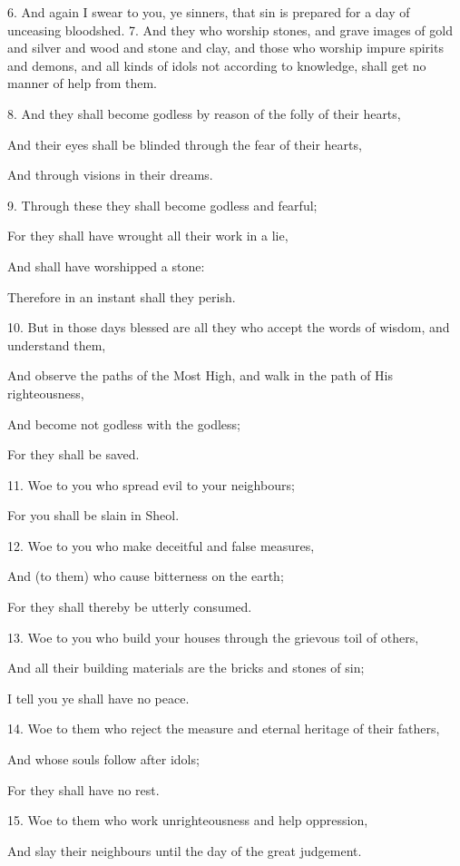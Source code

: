6. And again I swear to you, ye sinners, that sin is
prepared for a day of unceasing bloodshed. 7. And
they who worship stones, and grave images of gold
and silver and wood and stone and clay, and those
who worship impure spirits and demons, and all
kinds of idols not according to knowledge, shall get
no manner of help from them.

8. And they shall become godless by reason of the folly of their hearts,

And their eyes shall be blinded through the fear of their hearts,

And through visions in their dreams.

9. Through these they shall become godless and fearful;

For they shall have wrought all their work in a lie,

And shall have worshipped a stone:

Therefore in an instant shall they perish.

10. But in those days blessed are all they who accept the words of wisdom, and understand them,

And observe the paths of the Most High, and walk in the path of His righteousness,

And become not godless with the godless;

For they shall be saved.

11. Woe to you who spread evil to your neighbours;

For you shall be slain in Sheol.

12. Woe to you who make deceitful and false measures,

And (to them) who cause bitterness on the earth;

For they shall thereby be utterly consumed.

13. Woe to you who build your houses through the grievous toil of others,

And all their building materials are the bricks and stones of sin;

I tell you ye shall have no peace.

14. Woe to them who reject the measure and eternal heritage of their fathers,

And whose souls follow after idols;

For they shall have no rest.

15. Woe to them who work unrighteousness and help oppression,

And slay their neighbours until the day of the great judgement.


